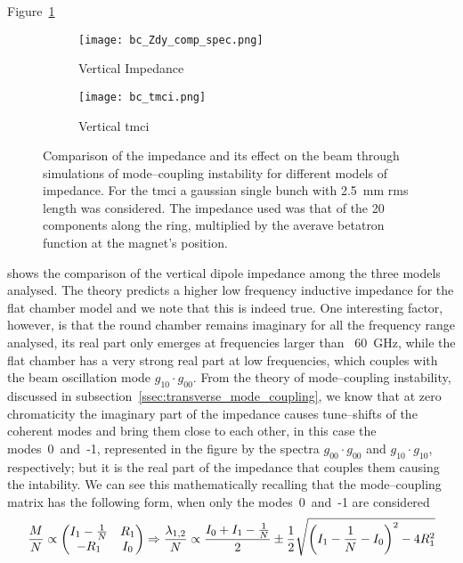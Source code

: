     Figure~\ref{fig:bc_zdy_comp}
    \begin{figure}[t]
        \centering
        \begin{subfigure}[c]{0.48\textwidth}
            \centering
            \texttt{[image: bc\_Zdy\_comp\_spec.png]}
            \caption{Vertical Impedance}
            \label{fig:bc_zdy_comp}
        \end{subfigure}\hfill
        \begin{subfigure}[c]{0.48\textwidth}
            \centering
            \texttt{[image: bc\_tmci.png]}
            \caption{Vertical \gls{tmci}}
            \label{fig:bc_tmci}
        \end{subfigure}
        \caption[Comparison of the vertical dipole impedance among different models of BC chamber.]{Comparison of the impedance and its effect on the beam through simulations of mode--coupling instability for different models of impedance. For the \gls{tmci} a gaussian single bunch with \SI{2.5}{\milli\meter} \gls{rms} length was considered. The impedance used was that of the 20 components along the ring, multiplied by the averave betatron function at the magnet's position.}
        \label{fig:bc_comparisons}
    \end{figure}
     shows the comparison of the vertical dipole impedance among the three models analysed. The theory predicts a higher low frequency inductive impedance for the flat chamber model and we note that this is indeed true. One interesting factor, however, is that the round chamber remains imaginary for all the frequency range analysed, its real part only emerges at frequencies larger than ~\SI{60}{\giga\hertz}, while the flat chamber has a very strong real part at low frequencies, which couples with the beam oscillation mode $g_{10}\cdot g_{00}$. From the theory of mode--coupling instability, discussed in subsection~\ref{ssec:transverse_mode_coupling}, we know that at zero chromaticity the imaginary part of the impedance causes tune--shifts of the coherent modes and bring them close to each other, in this case the modes~0~and~-1, represented in the figure by the spectra $g_{00}\cdot g_{00}$ and $g_{10}\cdot g_{10}$, respectively; but it is the real part of the impedance that couples them causing the intability. We can see this mathematically recalling that the mode--coupling matrix has the following form, when only the modes~0~and~-1 are considered
     \begin{align}\label{eq:bc_eigen_value}
         \frac{M}{N} \propto
         \begin{pmatrix} I_1 -\frac1N & R_1 \\ -R_1 & I_0 \end{pmatrix}
         \Rightarrow
         \frac{\lambda_{1,2}}{N} \propto \frac{I_0 + I_1 -\frac1N}{2} \pm \frac12\sqrt{\left(I_1-\frac1N - I_0\right)^2 - 4R_1^2}
     \end{align}
